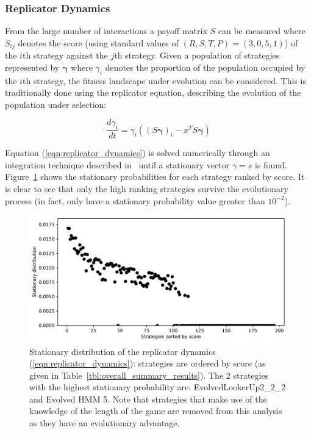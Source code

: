 \documentclass[a4paper]{article}
\begin{document}
\subsubsection{Replicator Dynamics}

From the large number of interactions a payoff matrix \(S\) can be measured
where \(S_{ij}\) denotes the score (using standard values of \((R, S, T, P) =
(3, 0, 5, 1)\)) of the \(i\)th strategy against the \(j\)th strategy. Given a
population of strategies represented by \(\boldsymbol{\gamma}\) where \(\gamma_i\)
denotes the proportion of the population occupied by the \(i\)th strategy, the
fitness landscape under evolution can be considered. This is traditionally done
using the replicator equation, describing the evolution of the population
under selection:

\begin{equation}\label{eqn:replicator_dynamics}
    \frac{d \gamma_i}{dt} = \gamma_i ((S\boldsymbol{\gamma})_i - x^T S \boldsymbol{\gamma})
\end{equation}

Equation (\ref{eqn:replicator_dynamics}) is solved numerically through an
integration technique described in~\cite{Petzold1983} until a stationary vector
\(\gamma=s\) is found.
Figure~\ref{fig:replicator_dynamics} shows the stationary probabilities for each
strategy ranked by score.
It is clear to see that
only the high ranking strategies survive the evolutionary process (in fact,
only have a stationary
probability value greater than \(10 ^ {-2}\)).

\begin{figure}[!htbp]
    \centering
    \includegraphics[width=.8\textwidth]{./assets/img/replicator_dynamics/main.pdf}
    \caption{Stationary distribution of the replicator dynamics
    (\ref{eqn:replicator_dynamics}): strategies are ordered by score (as given
    in Table~\ref{tbl:overall_summary_results}). The 2
    strategies with the highest stationary probability are:
    EvolvedLookerUp2\_2\_2 and Evolved HMM 5.
    Note that
    strategies that make use of the knowledge of the length of the game are
    removed from this analysis as they have an evolutionary advantage.}
    \label{fig:replicator_dynamics}
\end{figure}
\end{document}
